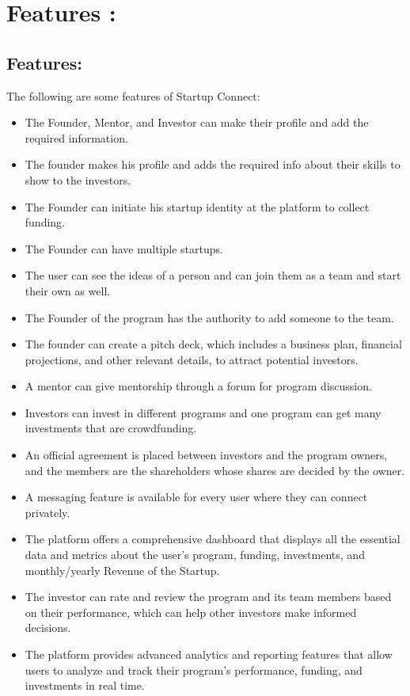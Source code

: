 \chapter{Features :} %
\label{Chapter2}
\section{Features:}
The following are some features of Startup Connect:
\begin{itemize}
\item The Founder, Mentor, and Investor can make their profile and add the required information.
\item The founder makes his profile and adds the required info about their skills to show to the investors.
\item The Founder can initiate his startup identity at the platform to collect funding.
\item The Founder can have multiple startups.
\item The user can see the ideas of a person and can join them as a team and start their own as well.
\item The Founder of the program has the authority to add someone to the team.
\item The founder can create a pitch deck, which includes a business plan, financial projections, and other relevant details, to attract potential investors.
\item A mentor can give mentorship through a forum for program discussion.
\item Investors can invest in different programs and one program can get many investments that are crowdfunding.
\item An official agreement is placed between investors and the program owners, and the members are the shareholders whose shares are decided by the owner.
\item A messaging feature is available for every user where they can connect privately.
\item The platform offers a comprehensive dashboard that displays all the essential data and metrics about the user's program, funding, investments, and monthly/yearly Revenue of the Startup.
\item The investor can rate and review the program and its team members based on their performance, which can help other investors make informed decisions.
\item The platform provides advanced analytics and reporting features that allow users to analyze and track their program's performance, funding, and investments in real time.

\end{itemize}

